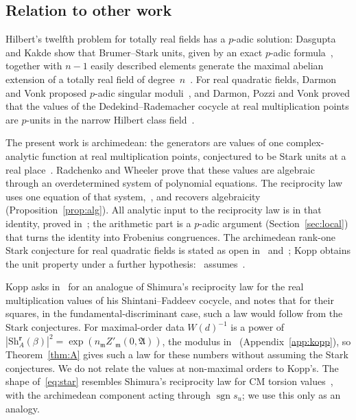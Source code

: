 \documentclass[11pt]{amsart}
\numberwithin{equation}{section}
\theoremstyle{plain}
\theoremstyle{definition}
\theoremstyle{remark}
\newcommand{\sgn}{\operatorname{sgn}}
\begin{document}
\subsection{Relation to other work}\label{sec:other}

Hilbert's twelfth problem for totally real fields has a $p$-adic solution: Dasgupta and Kakde show that Brumer--Stark units, given by an exact $p$-adic formula~\cite{DK1}, together with $n-1$ easily described elements generate the maximal abelian extension of a totally real field of degree~$n$~\cite{DK2}. For real quadratic fields, Darmon and Vonk proposed $p$-adic singular moduli~\cite{DV}, and Darmon, Pozzi and Vonk proved that the values of the Dedekind--Rademacher cocycle at real multiplication points are $p$-units in the narrow Hilbert class field~\cite{DPV}.

The present work is archimedean: the generators are values of one complex-analytic function at real multiplication points, conjectured to be Stark units at a real place~\cite{Ko, RW}. Radchenko and Wheeler prove that these values are algebraic~\cite[Thm.~1]{RW} through an overdetermined system of polynomial equations. The reciprocity law uses one equation of that system,~\cite[(6)]{RW}, and recovers algebraicity (Proposition~\ref{prop:alg}). All analytic input to the reciprocity law is in that identity, proved in~\cite{RW}; the arithmetic part is a $p$-adic argument (Section~\ref{sec:local}) that turns the identity into Frobenius congruences. The archimedean rank-one Stark conjecture for real quadratic fields is stated as open in~\cite[\S1.5]{Ko} and~\cite[\S1]{RW}; Kopp obtains the unit property under a further hypothesis:~\cite[Thm.~1.3(2)]{Ko} assumes~\cite[Conj.~6.9]{Ko}.

Kopp asks in~\cite[\S1.5]{Ko} for an analogue of Shimura's reciprocity law for the real multiplication values of his Shintani--Faddeev cocycle, and notes that for their squares, in the fundamental-discriminant case, such a law would follow from the Stark conjectures. For maximal-order data $W(d)^{-1}$ is a power of $|\mathrm{Sh}^{\mathbf r}_A(\beta)|^2=\exp(n_{\mathfrak m}Z'_{\mathfrak m}(0,\mathfrak A))$, the modulus in~\cite[Thm.~1.1]{Ko} (Appendix~\ref{app:kopp}), so Theorem~\ref{thm:A} gives such a law for these numbers without assuming the Stark conjectures. We do not relate the values at non-maximal orders to Kopp's. The shape of~\eqref{eq:star} resembles Shimura's reciprocity law for CM torsion values~\cite[Ch.~5]{Shi}, with the archimedean component acting through $\sgn s_u$; we use this only as an analogy.
\end{document}

